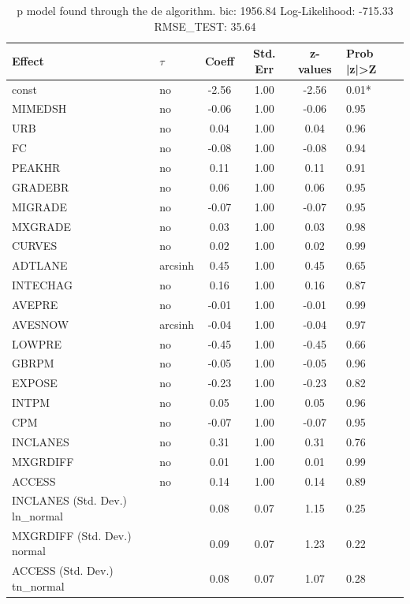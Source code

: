 \begin{table}
	\caption{p model found through the de algorithm. bic: 1956.84 Log-Likelihood: -715.33 RMSE_TEST: 35.64}
	\begin{center}
		\begin{tabular}{|l|l|c|c|c|l|}
			\hline
			Effect & $\tau$ & Coeff & Std. Err & z-values & Prob |z|>Z \\
			\hline
			const & no & -2.56 & 1.00 & -2.56 & 0.01* \\
			\hline
			MIMEDSH & no & -0.06 & 1.00 & -0.06 & 0.95 \\
			\hline
			URB & no & 0.04 & 1.00 & 0.04 & 0.96 \\
			\hline
			FC & no & -0.08 & 1.00 & -0.08 & 0.94 \\
			\hline
			PEAKHR & no & 0.11 & 1.00 & 0.11 & 0.91 \\
			\hline
			GRADEBR & no & 0.06 & 1.00 & 0.06 & 0.95 \\
			\hline
			MIGRADE & no & -0.07 & 1.00 & -0.07 & 0.95 \\
			\hline
			MXGRADE & no & 0.03 & 1.00 & 0.03 & 0.98 \\
			\hline
			CURVES & no & 0.02 & 1.00 & 0.02 & 0.99 \\
			\hline
			ADTLANE & arcsinh & 0.45 & 1.00 & 0.45 & 0.65 \\
			\hline
			INTECHAG & no & 0.16 & 1.00 & 0.16 & 0.87 \\
			\hline
			AVEPRE & no & -0.01 & 1.00 & -0.01 & 0.99 \\
			\hline
			AVESNOW & arcsinh & -0.04 & 1.00 & -0.04 & 0.97 \\
			\hline
			LOWPRE & no & -0.45 & 1.00 & -0.45 & 0.66 \\
			\hline
			GBRPM & no & -0.05 & 1.00 & -0.05 & 0.96 \\
			\hline
			EXPOSE & no & -0.23 & 1.00 & -0.23 & 0.82 \\
			\hline
			INTPM & no & 0.05 & 1.00 & 0.05 & 0.96 \\
			\hline
			CPM & no & -0.07 & 1.00 & -0.07 & 0.95 \\
			\hline
			INCLANES & no & 0.31 & 1.00 & 0.31 & 0.76 \\
			\hline
			MXGRDIFF & no & 0.01 & 1.00 & 0.01 & 0.99 \\
			\hline
			ACCESS & no & 0.14 & 1.00 & 0.14 & 0.89 \\
			\hline
			INCLANES (Std. Dev.) ln_normal &  & 0.08 & 0.07 & 1.15 & 0.25 \\
			\hline
			MXGRDIFF (Std. Dev.) normal &  & 0.09 & 0.07 & 1.23 & 0.22 \\
			\hline
			ACCESS (Std. Dev.) tn_normal &  & 0.08 & 0.07 & 1.07 & 0.28 \\
			\hline
		\end{tabular}
	\end{center}
\end{table}